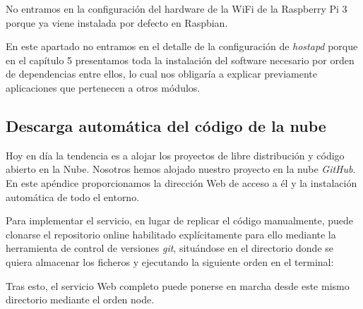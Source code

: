 \begin{appendices}
No entramos en la configuración del hardware de la WiFi de la Raspberry Pi 3 porque ya viene instalada por defecto en Raspbian.

En este apartado no entramos en el detalle de la configuración de \emph{hostapd} porque en el capítulo 5 presentamos toda la instalación del software necesario por orden de dependencias entre ellos, lo cual nos obligaría a explicar previamente aplicaciones que pertenecen a otros módulos.
\cleardoublepage
{}%
\begin{center}
\begin{minipage}{.75\textwidth}
\section{Descarga automática del código de la nube}\label{ApendiceB}

Hoy en día la tendencia es a alojar los proyectos de libre distribución y código abierto en la Nube. Nosotros hemos alojado nuestro proyecto en la nube \emph{GitHub}. En este apéndice proporcionamos la dirección Web de acceso a él y la instalación automática de todo el entorno.
\end{minipage}
\end{center}
\clearpage%

Para implementar el servicio, en lugar de replicar el código manualmente, puede clonarse el repositorio online habilitado explícitamente para ello mediante la herramienta de control de versiones \emph{git}, situándose en el directorio donde se quiera almacenar los ficheros y ejecutando la siguiente orden en el terminal: 


Tras esto, el servicio Web completo puede ponerse en marcha desde este mismo directorio mediante el orden node.


\end{appendices}
